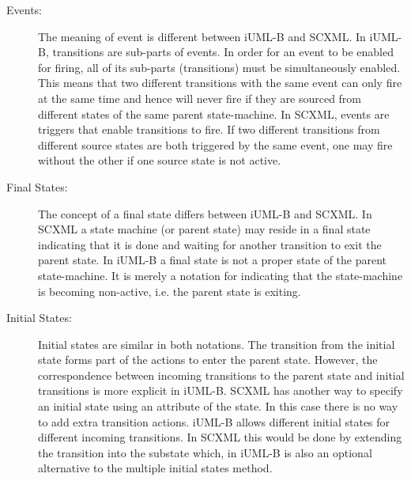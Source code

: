 \begin{description}

\item [Events:]
The meaning of event is different between iUML-B and SCXML.
 In iUML-B, transitions are sub-parts of events. 
 In order for an event to be enabled for firing, all of its sub-parts (transitions) must be simultaneously enabled. 
 This means that two different transitions with the same event can only fire at the same time and hence will never fire if they are sourced from different states of the same parent state-machine. 
In SCXML, events are triggers that enable transitions to fire. 
If two different transitions from different source states are both triggered by the same event, one may fire without the other if one source state is not active.

\item [Final States:]
The concept of a final state differs between iUML-B and SCXML. 
In SCXML a state machine (or parent state) may reside in a final state indicating that it is done and waiting for another transition to exit the parent state. 
 In iUML-B a final state is not a proper state of the parent state-machine. 
 It is merely a notation for indicating that the state-machine is becoming non-active, i.e. the parent state is exiting. 

\item [Initial States:]
Initial states are similar in both notations. 
The transition from the initial state forms part of the actions to enter the parent state. 
However, the correspondence between incoming transitions to the parent state and initial transitions is more explicit in iUML-B. 
SCXML has another way to specify an initial state using an attribute of the state.
 In this case there is no way to add extra transition actions.
iUML-B allows different initial states for different incoming transitions. 
In SCXML this would be done by extending the transition into the substate which, in iUML-B is also an optional alternative to the multiple initial states method.


\end{description}
